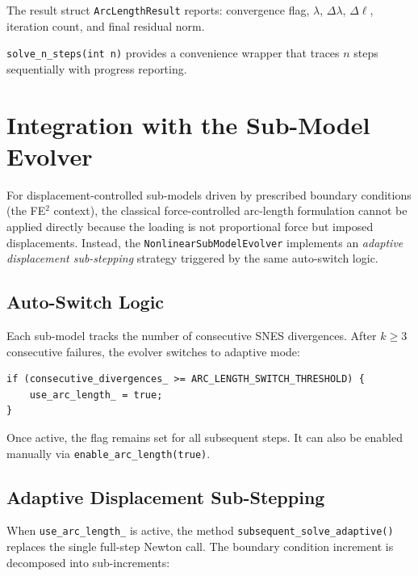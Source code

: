 The result struct \texttt{ArcLengthResult} reports: convergence flag,
$\lambda$, $\Delta\lambda$, $\Delta\ell$, iteration count, and
final residual norm.

\texttt{solve\_n\_steps(int n)} provides a convenience wrapper that
traces $n$ steps sequentially with progress reporting.


\section{Integration with the Sub-Model Evolver}
\label{sec:arc-evolver}

For displacement-controlled sub-models driven by prescribed boundary
conditions (the FE$^2$ context), the classical force-controlled
arc-length formulation cannot be applied directly because the loading
is not proportional force but imposed displacements.  Instead, the
\texttt{NonlinearSubModelEvolver} implements an \emph{adaptive
displacement sub-stepping} strategy triggered by the same auto-switch
logic.

\subsection{Auto-Switch Logic}

Each sub-model tracks the number of consecutive SNES divergences.
After $k \geq 3$ consecutive failures, the evolver switches to
adaptive mode:

\begin{verbatim}
if (consecutive_divergences_ >= ARC_LENGTH_SWITCH_THRESHOLD) {
    use_arc_length_ = true;
}
\end{verbatim}

Once active, the flag remains set for all subsequent steps.  It can
also be enabled manually via \texttt{enable\_arc\_length(true)}.

\subsection{Adaptive Displacement Sub-Stepping}

When \texttt{use\_arc\_length\_} is active, the method
\texttt{subsequent\_solve\_adaptive()} replaces the single full-step
Newton call.  The boundary condition increment is decomposed into
sub-increments:

